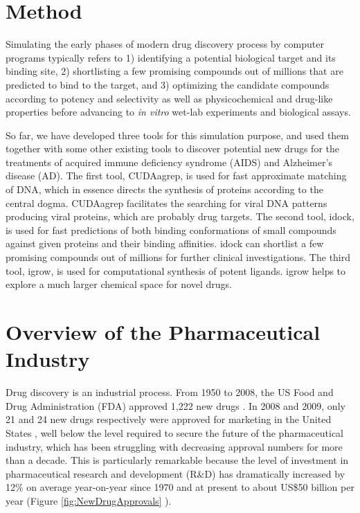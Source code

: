 \section{Method}

Simulating the early phases of modern drug discovery process by computer programs typically refers to 1) identifying a potential biological target and its binding site, 2) shortlisting a few promising compounds out of millions that are predicted to bind to the target, and 3) optimizing the candidate compounds according to potency and selectivity as well as physicochemical and drug-like properties before advancing to \textit{in vitro} wet-lab experiments and biological assays.

So far, we have developed three tools for this simulation purpose, and used them together with some other existing tools to discover potential new drugs for the treatments of acquired immune deficiency syndrome (AIDS) and Alzheimer's disease (AD). The first tool, CUDAagrep, is used for fast approximate matching of DNA, which in essence directs the synthesis of proteins according to the central dogma. CUDAagrep facilitates the searching for viral DNA patterns producing viral proteins, which are probably drug targets. The second tool, idock, is used for fast predictions of both binding conformations of small compounds against given proteins and their binding affinities. idock can shortlist a few promising compounds out of millions for further clinical investigations. The third tool, igrow, is used for computational synthesis of potent ligands. igrow helps to explore a much larger chemical space for novel drugs.

\section{Overview of the Pharmaceutical Industry}

Drug discovery is an industrial process. From 1950 to 2008, the US Food and Drug Administration (FDA) approved 1,222 new drugs \citep{717}. In 2008 and 2009, only 21 and 24 new drugs respectively were approved for marketing in the United States \citep{716}, well below the level required to secure the future of the pharmaceutical industry, which has been struggling with decreasing approval numbers for more than a decade. This is particularly remarkable because the level of investment in pharmaceutical research and development (R\&D) has dramatically increased by 12\% on average year-on-year since 1970 and at present to about US\$50 billion per year (Figure \ref{fig:NewDrugApprovals} \citep{686}).

